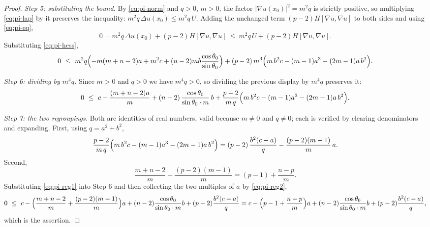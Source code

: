 \begin{proof}
\emph{Step 5: substituting the bound.} By \eqref{eq:pi-norm} and $q>0$, $m>0$,
the factor $\lvert\nabla u(x_0)\rvert^2=m^2q$ is strictly positive, so
multiplying \eqref{eq:pi-lap} by it preserves the inequality:
$m^2q\,\Delta u(x_0)\le m^2q\,U$. Adding the unchanged term
$(p-2)H[\nabla u,\nabla u]$ to both sides and using \eqref{eq:pi-eq},
\[
  0=m^2q\,\Delta u(x_0)+(p-2)H[\nabla u,\nabla u]
   \ \le\ m^2q\,U+(p-2)H[\nabla u,\nabla u].
\]
Substituting \eqref{eq:pi-hess},
\begin{equation}\label{eq:pi-mid}
  0\ \le\ m^2q\Bigl(-m(m+n-2)a+m^2c+(n-2)mb\frac{\cos\theta_0}{\sin\theta_0}\Bigr)
   +(p-2)\,m^3\Bigl(m\,b^2c-(m-1)a^3-(2m-1)a\,b^2\Bigr).
\end{equation}

\emph{Step 6: dividing by $m^4q$.} Since $m>0$ and $q>0$ we have $m^4q>0$, so
dividing the previous display by $m^4q$ preserves it:
\[
  0\ \le\ c-\frac{(m+n-2)a}{m}
    +(n-2)\,\frac{\cos\theta_0}{\sin\theta_0\cdot m}\,b
    +\frac{p-2}{m\,q}\Bigl(m\,b^2c-(m-1)a^3-(2m-1)a\,b^2\Bigr).
\]

\emph{Step 7: the two regroupings.} Both are identities of real numbers, valid
because $m\ne0$ and $q\ne0$; each is verified by clearing denominators and
expanding. First, using $q=a^2+b^2$,
\begin{equation}\label{eq:pi-reg1}
  \frac{p-2}{m\,q}\Bigl(m\,b^2c-(m-1)a^3-(2m-1)a\,b^2\Bigr)
  =(p-2)\,\frac{b^2(c-a)}{q}-\frac{(p-2)(m-1)}{m}\,a .
\end{equation}
Second,
\begin{equation}\label{eq:pi-reg2}
  \frac{m+n-2}{m}+\frac{(p-2)(m-1)}{m}=(p-1)+\frac{n-p}{m}.
\end{equation}
Substituting \eqref{eq:pi-reg1} into Step 6 and then collecting the two
multiples of $a$ by \eqref{eq:pi-reg2},
\[
  0\ \le\ c-\Bigl(\frac{m+n-2}{m}+\frac{(p-2)(m-1)}{m}\Bigr)a
    +(n-2)\frac{\cos\theta_0}{\sin\theta_0\cdot m}b
    +(p-2)\frac{b^2(c-a)}{q}
  = c-\Bigl(p-1+\frac{n-p}{m}\Bigr)a
    +(n-2)\frac{\cos\theta_0}{\sin\theta_0\cdot m}b
    +(p-2)\frac{b^2(c-a)}{q},
\]
which is the assertion.
\end{proof}
